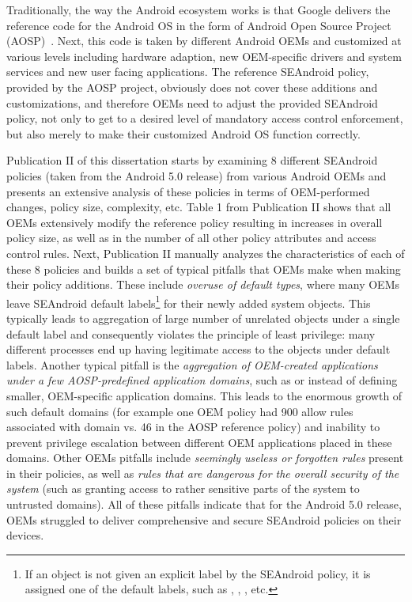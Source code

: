 Traditionally, the way the Android ecosystem works is that Google delivers the reference code for the Android OS in the form of Android Open Source Project (AOSP)~\cite{aosp}. Next, this code is taken by different Android OEMs and customized at various levels including hardware adaption, new OEM-specific drivers and system services and new user facing applications. The reference SEAndroid policy, provided by the AOSP project, obviously does not cover these additions and customizations, and therefore OEMs need to adjust the provided SEAndroid policy, not only to get to a desired level of mandatory access control enforcement, but also merely to make their customized Android OS function correctly.

Publication II of this dissertation starts by examining 8 different SEAndroid policies (taken from the Android 5.0 release) from various Android OEMs and presents an extensive analysis of these policies in terms of OEM-performed changes, policy size, complexity, etc. Table 1 from Publication II shows that all OEMs extensively modify the reference policy resulting in increases in overall policy size, as well as in the number of all other policy attributes and access control rules. Next, Publication II manually analyzes the characteristics of each of these 8 policies and builds a set of typical pitfalls that OEMs make when making their policy additions. These include \textit{overuse of default types}, where many OEMs leave SEAndroid default labels\footnote{If an object is not given an explicit label by the SEAndroid policy, it is assigned one of the default labels, such as , , , etc.} for their newly added system objects. This typically leads to aggregation of large number of unrelated objects under a single default label and consequently violates the principle of least privilege: many different processes end up having legitimate access to the objects under default labels. Another typical pitfall is the \textit{aggregation of OEM-created applications under a few AOSP-predefined application domains}, such as  or  instead of defining smaller, OEM-specific application domains. This leads to the enormous growth of such default domains (for example one OEM policy had 900 allow rules associated with  domain vs. 46 in the AOSP reference policy) and inability to prevent privilege escalation between different OEM applications placed in these domains. Other OEMs pitfalls include \textit{seemingly useless or forgotten rules} present in their policies, as well as \textit{rules that are dangerous for the overall security of the system} (such as granting access to rather sensitive parts of the system to untrusted domains). All of these pitfalls indicate that for the Android 5.0 release, OEMs struggled to deliver comprehensive and secure SEAndroid policies on their devices. 

